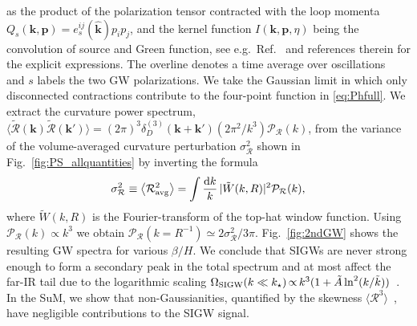 \documentclass[twocolumn,superscriptaddress,aps,preprintnumbers,amsmath,amssymb,prl,footinbib]{revtex4-2}
\begin{document}
as the product of the polarization tensor contracted with the loop momenta $Q_{s}(\mathbf{k},\mathbf{p}) = e_{s}^{ij}(\hat{\mathbf{k}})p_ip_j$, and the kernel function $ I(\mathbf{k},\mathbf{p},\eta)$ being the convolution of source and Green function, see e.g.~Ref.~\cite{LISACosmologyWorkingGroup:2025vdz} and references therein for the explicit expressions.
The overline denotes a time average over oscillations~\cite{Maggiore:1999vm} and $s$ labels the two GW polarizations. We take the Gaussian limit in which only disconnected contractions contribute to the four-point function in \eqref{eq:Phfull}.
We extract the curvature power spectrum,
$\langle \tilde{\mathcal{R}}(\mathbf{k})\tilde{\mathcal{R}}(\mathbf{k}')\rangle = (2\pi)^3\delta_D^{(3)}(\mathbf{k}+\mathbf{k}')(2\pi^2/k^3)\mathcal{P}_{\mathcal{R}}(k)$, from the variance of the volume-averaged curvature perturbation $\sigma_{\mathcal{R}}^2$ shown in Fig.~\ref{fig:PS_allquantities} by inverting the formula
\begin{align}
\label{eq:variance_power_spectrum}
\sigma_{\mathcal{R}}^2\equiv \left< \mathcal{R}_{\rm avg}^2\right>
= \int \frac{{\rm d}k}{k}\,| \tilde{W}(k,R)|^2 \mathcal{P}_{\mathcal{R}}(k),
\end{align}
where $\tilde{W}(k,R)$ is the Fourier-transform of the top-hat window function. Using $\mathcal{P}_\mathcal{R}(k)\propto k^3$ we obtain $\mathcal{P}_{\mathcal{R}}(k=R^{-1}) \simeq 2\sigma_\mathcal{R}^2/3\pi$.
Fig.~\ref{fig:2ndGW} shows the resulting GW spectra for various $\beta/H$.
We conclude that SIGWs are never strong enough to form a secondary peak in the total spectrum and at most affect the far-IR tail due to the logarithmic scaling
$\Omega_{\rm SIGW} (k \ll k_{\star}) \, {\propto}\, k^3(1 + \tilde A \ln^2(k/\tilde k))$~\cite{Atal:2021jyo}. {In the SuM, we show that non-Gaussianities, quantified by the skewness $\langle\mathcal{R}^3\rangle$~\cite{Luo:1992er,Komatsu:2001rj,Nakama:2016gzw,Garcia-Bellido:2017aan,Unal:2018yaa,Cai:2018dig,Cai:2019amo,Ragavendra:2020sop,Yuan:2020iwf,Adshead:2021hnm,Davies:2021loj,Abe:2022xur,Garcia-Saenz:2022tzu,Garcia-Saenz:2023zue,Li:2023xtl,Yuan:2023ofl,Perna:2024ehx,Gouttenoire:2025jxe}, have negligible contributions to the SIGW signal.}
\end{document}
